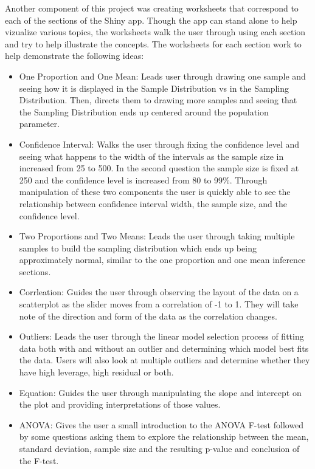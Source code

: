 \documentclass[11pt]{book}
\begin{document}
Another component of this project was creating worksheets that correspond to each of the sections of the Shiny app. Though the app can stand alone to help vizualize various topics, the worksheets walk the user through using each section and try to help illustrate the concepts. The worksheets for each section work to help demonstrate the following ideas:
\begin{itemize}

\item One Proportion and One Mean: Leads user through drawing one sample and seeing how it is displayed in the Sample Distribution vs in the Sampling Distribution. Then, directs them to drawing more samples and seeing that the Sampling Distribution ends up centered around the population parameter.  

\item   Confidence Interval: Walks the user through fixing the confidence level and seeing what happens to the width of the intervals as the sample size in increased from 25 to 500. In the second question the sample size is fixed at 250 and the confidence level is increased from 80 to 99$\%$.  Through manipulation of these two components the user is quickly able to see the relationship between confidence interval width, the sample size, and the confidence level.
  
\item   Two Proportions and Two Means: Leads the user through taking multiple samples to build the sampling distribution which ends up being approximately normal, similar to the one proportion and one mean inference sections.
  
\item   Corrleation: Guides the user through observing the layout of the data on a scatterplot as the slider moves from a correlation of -1 to 1. They will take note of the direction and form of the data as the correlation changes. 

\item Outliers: Leads the user through the linear model selection process of fitting data both with and without an outlier and determining which model best fits the data.  Users will also look at multiple outliers and determine whether they have high leverage, high residual or both.

\item Equation: Guides the user through manipulating the slope and intercept on the plot and providing interpretations of those values.
  
\item   ANOVA:  Gives the user a small introduction to the ANOVA F-test followed by some questions asking them to explore the relationship between the mean, standard deviation, sample size and the resulting p-value and conclusion of the F-test. 
\end{itemize}

\end{document}
